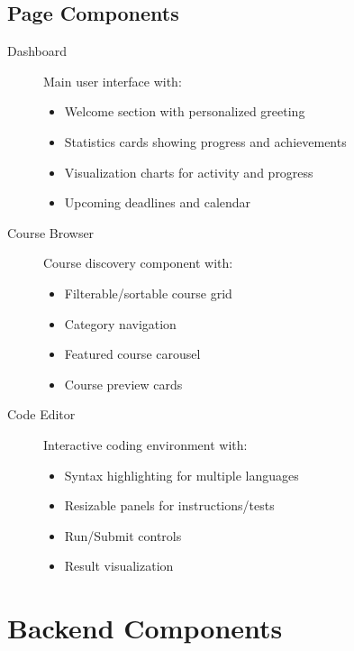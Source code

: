 \documentclass[a4paper, 11pt]{scrreprt}
\begin{document}
\subsection{Page Components}
\begin{description}
    \item[Dashboard] Main user interface with:
    \begin{itemize}
        \item Welcome section with personalized greeting
        \item Statistics cards showing progress and achievements
        \item Visualization charts for activity and progress
        \item Upcoming deadlines and calendar
    \end{itemize}
    
    \item[Course Browser] Course discovery component with:
    \begin{itemize}
        \item Filterable/sortable course grid
        \item Category navigation
        \item Featured course carousel
        \item Course preview cards
    \end{itemize}
    
    \item[Code Editor] Interactive coding environment with:
    \begin{itemize}
        \item Syntax highlighting for multiple languages
        \item Resizable panels for instructions/tests
        \item Run/Submit controls
        \item Result visualization
    \end{itemize}
\end{description}

\section{Backend Components}
\end{document}
